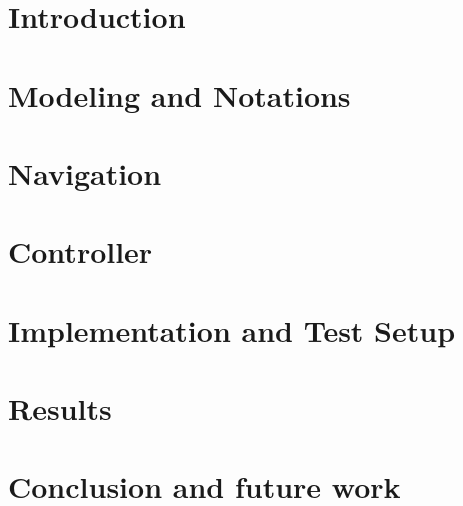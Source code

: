 \documentclass[10pt,b5paper,twoside,openright]{book}
\begin{document}
  \frontmatter
  \pagestyle{plain}
  \begingroup
  \let\cleardoublepage\clearpage%
  
   
  
  \tableofcontents  \clearpage
  \afterpage{\null\newpage}
  \listoftables     \clearpage
  \afterpage{\null\newpage}
  \listoffigures    %
  \printglossary    %
  \endgroup

  \mainmatter
  \pagestyle{headings}
  \chapter{Introduction}\label{cha:introduction}
  
  \chapter{Modeling and Notations}\label{cha:modeling}
  
  \chapter{Navigation}\label{cha:navigation}
  
  
  
  \chapter{Controller}\label{cha:controller}
  
  
  \chapter{Implementation and Test Setup}\label{cha:test_setup}
  
  
  \chapter{Results}\label{cha:results}
  
  
  
  \chapter{Conclusion and future work}\label{cha:conclusion_and_future_work}
  

  \backmatter
  
\end{document}
